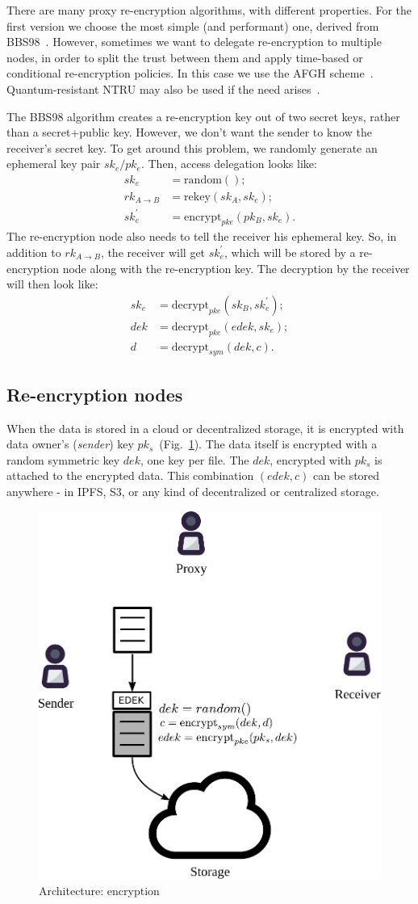 \documentclass[notitlepage,longbibliography]{revtex4-1}
\begin{document}
There are many proxy re-encryption algorithms, with different properties.
For the first version we choose the most simple (and performant) one, derived from BBS98~\cite{BBS98}.
However, sometimes we want to delegate re-encryption to multiple nodes, in order to split the trust between them and apply time-based or conditional
re-encryption policies.
In this case we use the AFGH scheme~\cite{AFGH}.
Quantum-resistant NTRU may also be used if the need arises~\cite{wiki:ntru,ntrureencrypt}.

The BBS98 algorithm creates a re-encryption key out of two secret keys, rather than a secret+public key.
However, we don't want the sender to know the receiver's secret key.
To get around this problem, we randomly generate an ephemeral key pair $sk_e/pk_e$.
Then, access delegation looks like:
\begin{align}
    sk_e &= \text{random}();\\
    rk_{A\rightarrow B} &= \text{rekey}(sk_A, sk_e);\\
    sk_e^{\prime} &= \text{encrypt}_{pke}(pk_B, sk_e).
\end{align}
The re-encryption node also needs to tell the receiver his ephemeral key.
So, in addition to $rk_{A\rightarrow B}$, the receiver will get $sk_e^{\prime}$, which will be stored by a re-encryption node along with the re-encryption key.
The decryption by the receiver will then look like:
\begin{align}
    sk_e &= \text{decrypt}_{pke}(sk_B, sk_e^{\prime});\\
    dek &= \text{decrypt}_{pke}(edek, sk_e);\\
    d &= \text{decrypt}_{sym}(dek, c).
\end{align}

\subsection{Re-encryption nodes}

When the data is stored in a cloud or decentralized storage, it is encrypted with data owner's (\emph{sender}) key $pk_s$~(Fig.~\ref{fig:arch-encrypt}).
The data itself is encrypted with a random symmetric key $dek$, one key per file.
The $dek$, encrypted with $pk_s$ is attached to the encrypted data.
This combination $(edek, c)$ can be stored anywhere - in IPFS, S3, or any kind of decentralized or centralized storage.
\begin{figure}
\centering
    \includegraphics[width=0.4\columnwidth]{pdf/encrypt.pdf}
    \caption{Architecture: encryption}
    \label{fig:arch-encrypt}
\end{figure}
\end{document}
